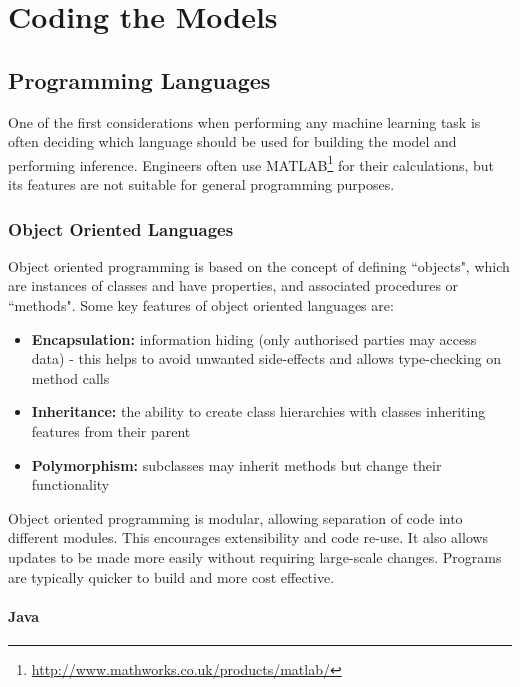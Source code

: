 \chapter{Coding the Models}\label{chap:codingTheModels}

\section{Programming Languages}

One of the first considerations when performing any machine learning task is often deciding which language should be used for building the model and performing inference. Engineers often use MATLAB\footnote{\url{http://www.mathworks.co.uk/products/matlab/}} for their calculations, but its features are not suitable for general programming purposes.

\subsection{Object Oriented Languages}

Object oriented programming is based on the concept of defining ``objects", which are instances of classes and have properties, and associated procedures or ``methods". Some key features of object oriented languages are:

\begin{itemize}

\item \textbf{Encapsulation:} information hiding (only authorised parties may access data) - this helps to avoid unwanted side-effects and allows type-checking on method calls
\item \textbf{Inheritance:} the ability to create class hierarchies with classes inheriting features from their parent
\item \textbf{Polymorphism:} subclasses may inherit methods but change their functionality

\end{itemize}

Object oriented programming is modular, allowing separation of code into different modules. This encourages extensibility and code re-use. It also allows updates to be made more easily without requiring large-scale changes. Programs are typically quicker to build and more cost effective.

\subsubsection{Java}

